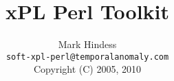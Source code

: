 \documentclass[12pt,a4paper]{article}
\title{xPL Perl Toolkit}
\author{Mark Hindess\\
  \texttt{soft-xpl-perl@temporalanomaly.com}\\
  Copyright (C) 2005, 2010}
\begin{document}
\newcommand{\comment}[1]{}
\setlength{\parindent}{0pt}
\addtolength{\parskip}{5pt}

\def\href#1#2{\special{html:<a href="#1">}{#2}\special{html:</a>}}
\def\url#1{\special{html:<a href="#1">}{\tt{#1}}\special{html:</a>}}
\def\msg#1{\texttt{#1}}
\def\method#1{\texttt{#1}}
\def\field#1{\texttt{#1}}
\def\cmd#1{\texttt{#1}}

\maketitle
\newpage
\tableofcontents
\end{document}
